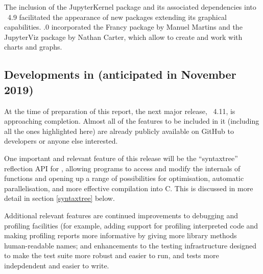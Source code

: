 The inclusion of the {\sf JupyterKernel} package and its associated 
dependencies into \GAP~4.9 facilitated the appearance of new packages
extending its graphical capabilities. .0 incorporated 
the {\sf Francy} package \cite{Francy} by Manuel Martins and
the {\sf JupyterViz} package \cite{JupyterViz} by Nathan Carter, which
allow to create and work with charts and graphs.



\subsection{Developments in  (anticipated in November 2019)}\label{gap-4.11}



At the time of preparation of this report, the next major release,
\GAP~4.11,
is approaching completion. Almost all of the features to be
included in it (including all the ones highlighted here) are already
publicly  available on GitHub to developers or anyone else interested.

One important and relevant feature of this release will be the ``syntaxtree'' reflection
API for \GAP, allowing \GAP programs to access and modify the internals of \GAP
functions and opening up a range of possibilities for optimisation, automatic
parallelisation, and more effective compilation into C. This is
discussed in more detail in section \ref{syntaxtree} below. 

Additional relevant features are continued improvements to debugging and
profiling facilities (for example,
adding support for profiling interpreted code
and 
making profiling reports more informative by 
giving more library methods human-readable names;
and enhancements to the testing infrastructure designed to make the
test suite more robust and easier to run, and tests more indepdendent
and easier to write.

